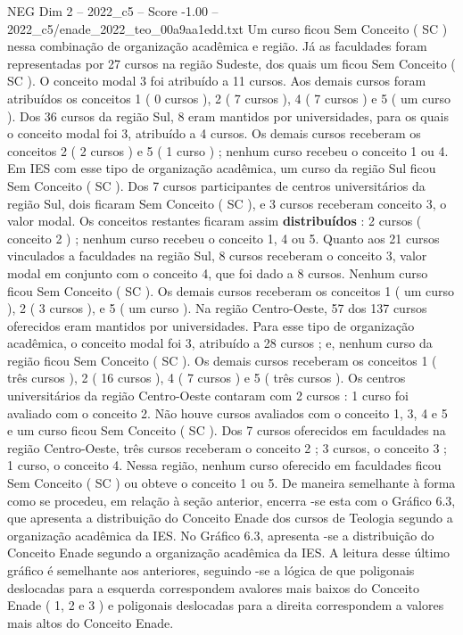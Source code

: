 \begin{textsample}{NEG Dim 2 – 2022\_c5 – Score -1.00 – 2022\_c5/enade\_2022\_teo\_00a9aa1edd.txt}
Um curso ficou Sem Conceito ( SC ) nessa combinação de organização acadêmica e região.
Já as faculdades foram representadas por 27 cursos na região Sudeste, dos quais um ficou Sem Conceito ( SC ).
O conceito modal 3 foi atribuído a 11 cursos.
Aos demais cursos foram atribuídos os conceitos 1 ( 0 cursos ), 2 ( 7 cursos ), 4 ( 7 cursos ) e 5 ( um curso ).
Dos 36 cursos da região Sul, 8 eram mantidos por universidades, para os quais o conceito modal foi 3, atribuído a 4 cursos.
Os demais cursos receberam os conceitos 2 ( 2 cursos ) e 5 ( 1 curso ) ; nenhum curso recebeu o conceito 1 ou 4.
Em IES com esse tipo de organização acadêmica, um curso da região Sul ficou Sem Conceito ( SC ).
Dos 7 cursos participantes de centros universitários da região Sul, dois ficaram Sem Conceito ( SC ), e 3 cursos receberam conceito 3, o valor modal.
Os conceitos restantes ficaram assim \textbf{distribuídos} : 2 cursos ( conceito 2 ) ; nenhum curso recebeu o conceito 1, 4 ou 5.
Quanto aos 21 cursos vinculados a faculdades na região Sul, 8 cursos receberam o conceito 3, valor modal em conjunto com o conceito 4, que foi dado a 8 cursos.
Nenhum curso ficou Sem Conceito ( SC ).
Os demais cursos receberam os conceitos 1 ( um curso ), 2 ( 3 cursos ), e 5 ( um curso ).
Na região Centro-Oeste, 57 dos 137 cursos oferecidos eram mantidos por universidades.
Para esse tipo de organização acadêmica, o conceito modal foi 3, atribuído a 28 cursos ; e, nenhum curso da região ficou Sem Conceito ( SC ).
Os demais cursos receberam os conceitos 1 ( três cursos ), 2 ( 16 cursos ), 4 ( 7 cursos ) e 5 ( três cursos ).
Os centros universitários da região Centro-Oeste contaram com 2 cursos : 1 curso foi avaliado com o conceito 2.
Não houve cursos avaliados com o conceito 1, 3, 4 e 5 e um curso ficou Sem Conceito ( SC ).
Dos 7 cursos oferecidos em faculdades na região Centro-Oeste, três cursos receberam o conceito 2 ; 3 cursos, o conceito 3 ; 1 curso, o conceito 4.
Nessa região, nenhum curso oferecido em faculdades ficou Sem Conceito ( SC ) ou obteve o conceito 1 ou 5.
De maneira semelhante à forma como se procedeu, em relação à seção anterior, encerra -se esta com o Gráfico 6.3, que apresenta a distribuição do Conceito Enade dos cursos de Teologia segundo a organização acadêmica da IES.
No Gráfico 6.3, apresenta -se a distribuição do Conceito Enade segundo a organização acadêmica da IES.
A leitura desse último gráfico é semelhante aos anteriores, seguindo -se a lógica de que poligonais deslocadas para a esquerda correspondem avalores mais baixos do Conceito Enade ( 1, 2 e 3 ) e poligonais deslocadas para a direita correspondem a valores mais altos do Conceito Enade.

\end{textsample}
